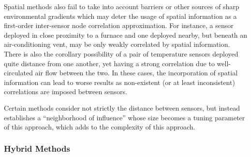 Spatial methods also fail to take into account barriers or other sources of sharp environmental gradients which may deter the usage of spatial information as a first-order inter-sensor node correlation approximation.
For instance, a sensor deployed in close proximity to a furnace and one deployed nearby, but beneath an air-conditioning vent, may be only weakly correlated by spatial information.
There is also the corollary possibility of a pair of temperature sensors deployed quite distance from one another, yet having a strong correlation due to well-circulated air flow between the two.
In these cases, the incorporation of spatial information can lead to worse results as non-existent (or at least inconsistent) correlations are imposed between sensors.



Certain methods consider not strictly the distance between sensors, but instead establishes a ``neighborhood of influence'' whose size becomes a tuning parameter of this approach, which adds to the complexity of this approach.


\subsubsection{Hybrid Methods}





